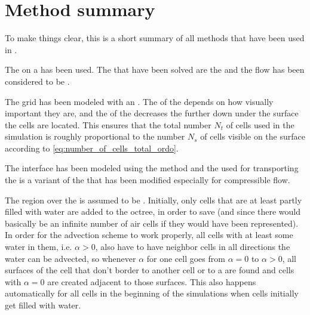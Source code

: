 \chapter{Method summary}
\label{chap:methodsummary}

To make things clear, this is a short summary of all methods that have been used in \thisprojectwork.

The \FVM on a  has been used. The \PDEs that have been solved are the  and the flow has been considered to be .

The grid has been modeled with an \octree. The \LOD of the  depends on how visually important they are, and the \LOD of the  decreases the further down under the surface the cells are located. This ensures that the total number $N_t$ of cells used in the simulation is roughly proportional to the number $N_s$ of cells visible on the surface according to \eqref{eq:number_of_cells_total_ordo}.

The interface has been modeled using the \VOF method and the  used for transporting the  is a variant of the  that has been modified especially for compressible flow.

The region over the  is assumed to be \air. Initially, only cells that are at least partly filled with water are added to the octree, in order to save  (and since there would basically be an infinite number of air cells if they would have been represented). In order for the advection scheme to work properly, all cells with at least some water in them, i.e. $\alpha > 0$, also have to have neighbor cells in all directions the water can be advected, so whenever $\alpha$ for one cell goes from $\alpha = 0$ to $\alpha > 0$, all surfaces of the cell that don't border to another cell or to a  are found and cells with $\alpha = 0$ are created adjacent to those surfaces. This also happens automatically for all cells in the beginning of the simulations when cells initially get filled with water.
